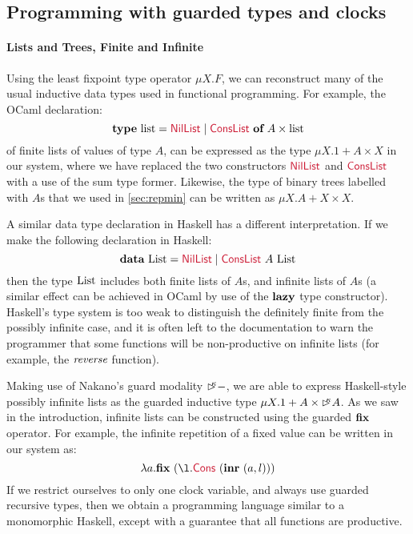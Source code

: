 \subsection{Programming with guarded types and clocks}
\label{sec:examples}

\paragraph{Lists and Trees, Finite and Infinite} Using the least
fixpoint type operator $\mu X. F$, we can reconstruct many of the
usual inductive data types used in functional programming. For
example, the OCaml declaration:
\begin{displaymath}
  \kw{type}~\tyname{list} = \cons{NilList} \mathrel| \cons{ConsList}~\kw{of}~A\times\tyname{list}
\end{displaymath}
of finite lists of values of type $A$, can be expressed as the type
$\mu X. 1 + A \times X$ in our system, where we have replaced the two
constructors $\cons{NilList}$ and $\cons{ConsList}$ with a use of the
sum type former. Likewise, the type of binary trees labelled with $A$s
that we used in \autoref{sec:repmin} can be written as $\mu X. A + X
\times X$.

A similar data type declaration in Haskell has a different
interpretation. If we make the following declaration in Haskell:
\begin{displaymath}
  \kw{data}~\tyname{List} = \cons{NilList} \mathrel| \cons{ConsList}~A~\tyname{List}
\end{displaymath}
then the type $\textrm{List}$ includes both finite lists of $A$s, and
infinite lists of $A$s (a similar effect can be achieved in OCaml by
use of the $\textbf{lazy}$ type constructor). Haskell's type system is too
weak to distinguish the definitely finite from the possibly infinite
case, and it is often left to the documentation to warn the programmer
that some functions will be non-productive on infinite lists (for
example, the $\textit{reverse}$ function).

Making use of Nakano's guard modality $\mathord{\rhd\kern-0.4em^{\kappa}}-$, we are able to
express Haskell-style possibly infinite lists as the guarded inductive
type $\mu X. 1 + A \times \mathord{\rhd\kern-0.4em^{\kappa}} A$. As we saw in the
introduction, infinite lists can be constructed using the guarded
$\textbf{fix}$ operator. For example, the infinite repetition of a fixed
value can be written in our system as:
\begin{displaymath}
  \lambda a. \kw{fix}~(\l. \cons{Cons}~(\kw{inr}~(a,l)))
\end{displaymath}
If we restrict ourselves to only one clock variable, and always use
guarded recursive types, then we obtain a programming language similar
to a monomorphic Haskell, except with a guarantee that all functions
are productive.


